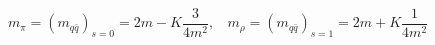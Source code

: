 \begin{equation}
m_\pi= (m_{q\bar{q}})_{s=0}=2m-K\frac{3}{4m^2},~~~~m_\rho= (m_{q\bar{q}})_{s=1}=2m+K\frac{1}{4m^2}
\end{equation} 
